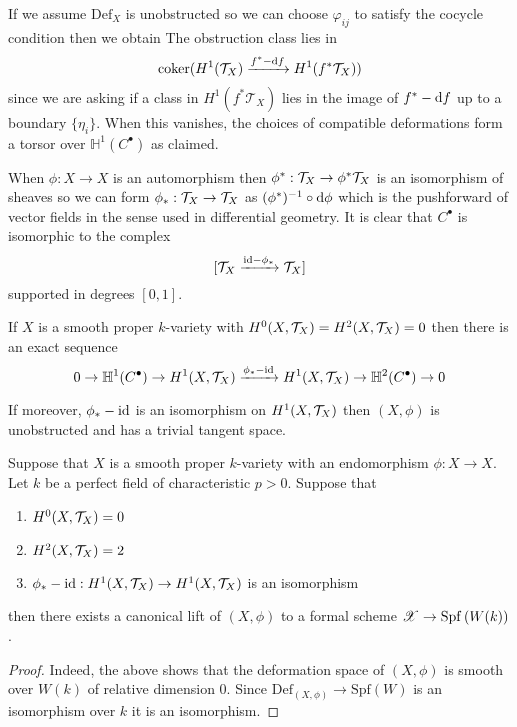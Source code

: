 \documentclass[12pt]{article}
\newcommand{\HH}{\mathbb{H}}
\newcommand{\Def}{\mathrm{Def}}
\newcommand{\Spf}[1]{\mathrm{Spf}\left( #1 \right)}
\begin{document}
\begin{rmk}
If we assume $\Def_X$ is unobstructed so we can choose $\varphi_{ij}$ to satisfy the cocycle condition then we obtain The obstruction class lies in
\[ \operatorname{\mathrm{coker}}(H^1(\mathcal{T}_X) \xrightarrow{f^* - \mathrm{d}{f}} H^1(f^*\mathcal{T}_X)) \]
since we are asking if a class in $H^1(f^* \mathcal{T}_X)$ lies in the image of $f^* - \mathrm{d}{f}$ up to a boundary $\{ \eta_i \}$.
When this vanishes, the choices of compatible deformations form a torsor over $\HH^1(C^\bullet)$ as claimed.
\end{rmk}

\begin{rmk}
When $\phi  : X \to X$ is an automorphism then $\phi^* : \mathcal{T}_X \to \phi^* \mathcal{T}_X$ is an isomorphism of sheaves so we can form $\phi_* : \mathcal{T}_X \to \mathcal{T}_X$ as $(\phi^*)^{-1} \circ \mathrm{d}{\phi}$ which is the pushforward of vector fields in the sense used in differential geometry. It is clear that $C^\bullet$ is isomorphic to the complex
\[ [\mathcal{T}_X \xrightarrow{\mathrm{id} - \phi_*} \mathcal{T}_X] \]
supported in degrees $[0,1]$.
\end{rmk}

\begin{lemma}
If $X$ is a smooth proper $k$-variety with $H^0(X, \mathcal{T}_X) = H^2(X, \mathcal{T}_X) = 0$ then there is an exact sequence
\[ 0 \to \HH^1(C^\bullet) \to H^1(X, \T_X) \xrightarrow{\phi_* - \id} H^1(X, \T_X) \to \HH^2(C^\bullet) \to 0 \] 
\end{lemma}

\begin{cor}
If moreover, $\phi_* - \mathrm{id}$ is an isomorphism on $H^1(X, \mathcal{T}_X)$ then $(X, \phi)$ is unobstructed and has a trivial tangent space. 
\end{cor}

\begin{cor}
Suppose that $X$ is a smooth proper $k$-variety with an endomorphism $\phi : X \to X$. Let $k$ be a perfect field of characteristic $p > 0$. Suppose that 
\begin{enumerate}
\item $H^0(X, \mathcal{T}_X) = 0$
\item $H^2(X, \mathcal{T}_X) = 2$
\item $\phi_* - \mathrm{id} : H^1(X, \mathcal{T}_X) \to H^1(X, \mathcal{T}_X)$ is an isomorphism
\end{enumerate}
then there exists a canonical lift of $(X, \phi)$ to a formal scheme $\X \to \Spf{W(k)}$.
\end{cor}

\begin{proof}
Indeed, the above shows that the deformation space of $(X, \phi)$ is smooth over $W(k)$ of relative dimension $0$. Since $\Def_{(X,\phi)} \to \Spf{W}$ is an isomorphism over $k$ it is an isomorphism. 
\end{proof}
\end{document}
